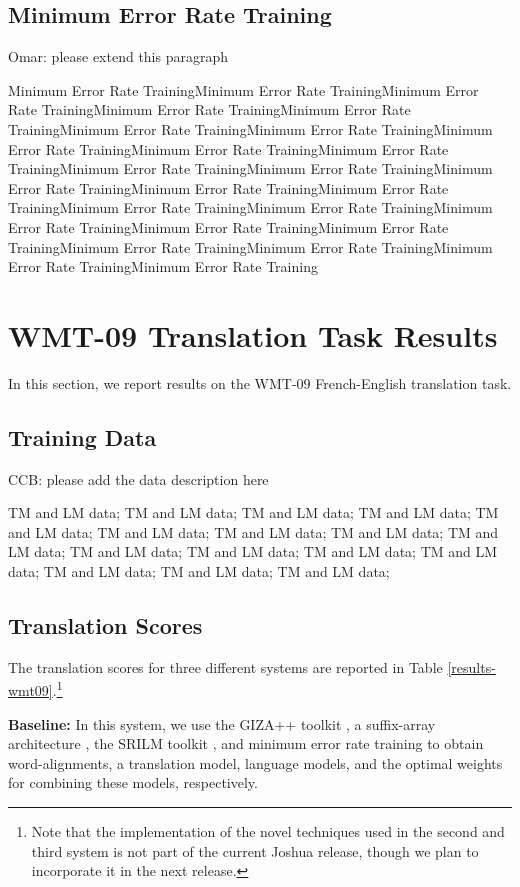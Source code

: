 \documentclass[11pt]{article}
\begin{document}
\subsection{Minimum Error Rate Training}
Omar: please extend this paragraph

Minimum Error Rate TrainingMinimum Error Rate TrainingMinimum Error Rate TrainingMinimum Error Rate TrainingMinimum Error Rate TrainingMinimum Error Rate TrainingMinimum Error Rate TrainingMinimum Error Rate TrainingMinimum Error Rate TrainingMinimum Error Rate TrainingMinimum Error Rate TrainingMinimum Error Rate TrainingMinimum Error Rate TrainingMinimum Error Rate TrainingMinimum Error Rate TrainingMinimum Error Rate TrainingMinimum Error Rate TrainingMinimum Error Rate TrainingMinimum Error Rate TrainingMinimum Error Rate TrainingMinimum Error Rate TrainingMinimum Error Rate TrainingMinimum Error Rate TrainingMinimum Error Rate Training



\section{WMT-09 Translation Task Results}
In this section, we report results on the WMT-09 French-English translation task.
\subsection{Training Data}
CCB: please add the data description here

TM and LM data; TM and LM data; TM and LM data; TM and LM data; TM and LM data; TM and LM data; TM and LM data; TM and LM data; TM and LM data; TM and LM data; TM and LM data; TM and LM data; TM and LM data; TM and LM data; TM and LM data; TM and LM data;


\subsection{Translation Scores}
The translation scores for three different systems are reported in Table \ref{results-wmt09}.\footnote{Note that the implementation of the novel techniques used in the second and third system is not part of the current Joshua release, though we plan to incorporate it in the next release.}


\textbf{Baseline: } In this system, we use the GIZA++ toolkit \cite{Och2003}, a suffix-array architecture \cite{Lopez2007}, the SRILM toolkit \cite{Stolcke2002}, and minimum error rate training \cite{Och2003c} to obtain word-alignments, a translation model, language models, and the optimal weights for combining these models, respectively.
\end{document}
